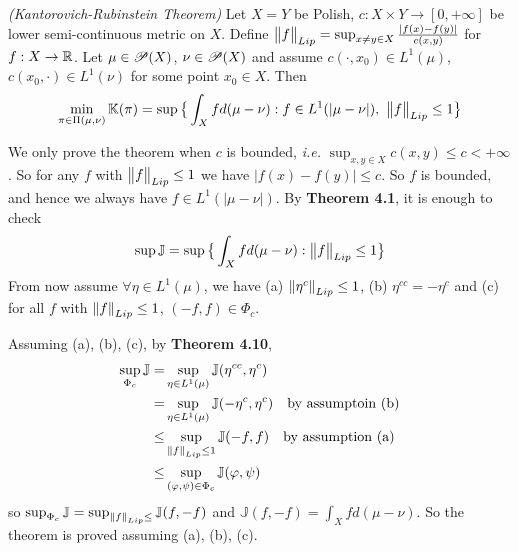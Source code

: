 \documentclass[12pt,a4paper]{article}
\newenvironment{proof}
{\begin{changemargin}{1cm}{0.5cm} 
	}%
	{\end{changemargin}
}
\newenvironment{p}
{\begin{proof} 
	}%
	{\end{proof}
}
\begin{document}
 \emph{(Kantorovich-Rubinstein Theorem)} Let $X= Y$ be Polish, $c: X\times Y \rightarrow [0, + \infty]$ be lower semi-continuous metric on $X$. Define $\bigl\lVert f\bigr\rVert_{Lip}= \sup_{x\neq y\in X} \frac{|f(x) - f(y)|}{c(x,y)}$ for $f: X\rightarrow \mathbb{R}$. Let $\mu \in \mathscr{P}(X)$, $\nu \in \mathscr{P}(X)$ and assume $c(\cdot, x_0) \in L^1(\mu)$, $c(x_0, \cdot) \in L^1(\nu)$ for some point $x_0 \in X$. Then
\begin{align*}
\min_{\pi \in \Pi(\mu, \nu)}\mathbb{K}(\pi) = \sup \big\{ \int_X f d(\mu - \nu) : f\in L^1(|\mu - \nu|), \,\, \bigl\lVert f\bigr\rVert_{Lip} \leq 1\big\}
\end{align*}
\begin{p}
\pf We only prove the theorem when $c$ is bounded, \textit{i.e.} $\sup_{x,y\in X} c(x,y) \leq c< + \infty$. So for any $f$ with $\bigl\lVert f\bigr\rVert_{Lip} \leq 1$ we have $|f(x) - f(y) | \leq c$. So $f$ is bounded, and hence we always have $f\in L^1(|\mu - \nu|)$.  By \textbf{Theorem 4.1}, it is enough to check
\begin{align*}
\sup \mathbb{J} = \sup \big\{ \int_X f d(\mu - \nu) : \bigl\lVert f\bigr\rVert_{Lip} \leq 1 \big\}
\end{align*}
From now assume $\forall \eta \in L^1(\mu)$, we have (a) $\snorms{\eta^c}{Lip}\leq 1$, (b) $\eta^{cc} = - \eta^c$ and (c) for all $f$ with $\snorms{f}{Lip} \leq 1$, $(-f, f) \in \Phi_c$.

\quad Assuming (a), (b), (c), by \textbf{Theorem 4.10},
\begin{align*}
\sup_{\Phi_c} \mathbb{J} = & \sup_{\eta \in L^1(\mu)} \mathbb{J}(\eta^{cc}, \eta^c) \\
= & \sup_{\eta \in L^1(\mu)} \mathbb{J}(-\eta^{c}, \eta^c) \quad \text{by assumptoin (b)} \\
\leq & \sup_{\snorms{f}{Lip}\leq 1} \mathbb{J}(-f, f) \quad \text{by assumption (a)} \\
\leq & \sup_{(\varphi, \psi) \in \Phi_c} \mathbb{J}(\varphi, \psi)
\end{align*}
so $\sup_{\Phi_c} \mathbb{J} = \sup_{\snorms{f}{Lip}\leq} \mathbb{J}(f, -f)$ and $\mathbb{J}(f, -f)= \int_X f d(\mu - \nu)$. So the theorem is proved assuming (a), (b), (c).
\s


\end{p}
\end{document}
